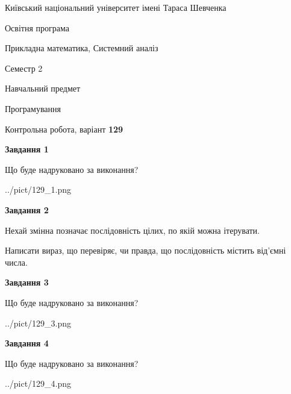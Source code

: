 \documentclass[12pt, ukrainian]{article}
\begin{document}
{{\begin {small}\par
{ \center  Київський національний університет імені Тараса Шевченка \par}
{\parbox {5 cm}{Освітня програма \hfill}{\parbox {8 cm}{Прикладна математика, Системний аналіз \hfill}}\parbox {5 cm}{\hfill Семестр 2}}\par
{\parbox {5 cm} {Навчальний предмет \hfill}\parbox {7 cm}{Програмування \hfill}\parbox {6cm}{\hfill}\par}\vspace{-7pt} \end{small}}{\center Контрольна робота, варіант  \No \textbf
{ 129 }\par}}
{
\begin {large}
{\begin {center}\textbf{Завдання 1}\end {center}}\par
Що буде надруковано за виконання?\par\par
\begin{center}
	{../pict/129_1.png}
\end{center}
\newpage

{\begin {center}\textbf{Завдання 2}\end {center}}\par
Нехай змінна  позначає послідовність цілих, по якій можна ітерувати.

Написати вираз, що перевіряє, чи правда, що послідовність  містить від’ємні числа.\par
\newpage

{\begin {center}\textbf{Завдання 3}\end {center}}\par
Що буде надруковано за виконання?\par
\begin{center}
	{../pict/129_3.png}
\end{center}
\newpage

{\begin {center}\textbf{Завдання 4}\end {center}}\par
Що буде надруковано за виконання?\par
\begin{center}
	{../pict/129_4.png}
\end{center}
\newpage


\end{large}}
\end{document}
